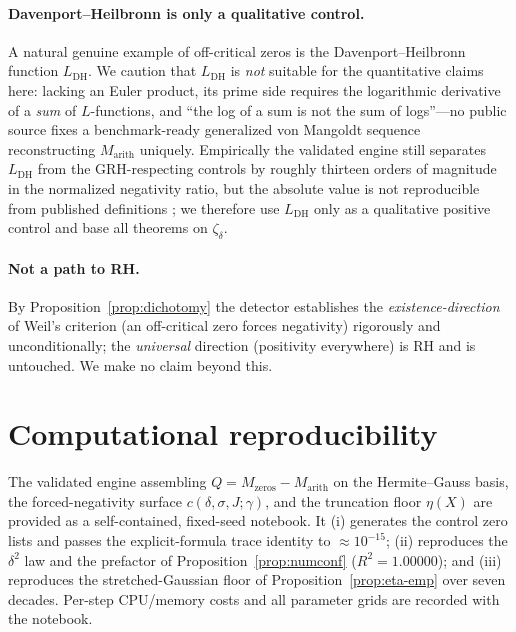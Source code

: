 \documentclass[11pt]{amsart}
\theoremstyle{definition}
\theoremstyle{remark}
\newcommand{\LDH}{L_{\mathrm{DH}}}
\begin{document}
\paragraph{Davenport--Heilbronn is only a qualitative control.}
A natural genuine example of off-critical zeros is the Davenport--Heilbronn
function $\LDH$. We caution that $\LDH$ is \emph{not} suitable for the
quantitative claims here: lacking an Euler product, its prime side requires
the logarithmic derivative of a \emph{sum} of $L$-functions, and ``the log of
a sum is not the sum of logs''---no public source fixes a benchmark-ready
generalized von Mangoldt sequence reconstructing $M_{\mathrm{arith}}$
uniquely. Empirically the validated engine still separates $\LDH$ from the
GRH-respecting controls by roughly thirteen orders of magnitude in the
normalized negativity ratio, but the absolute value is not reproducible from
published definitions \cite{TrejoV8}; we therefore use $\LDH$ only as a
qualitative positive control and base all theorems on $\zeta_\delta$.

\paragraph{Not a path to RH.}
By Proposition~\ref{prop:dichotomy} the detector establishes the
\emph{existence-direction} of Weil's criterion (an off-critical zero forces
negativity) rigorously and unconditionally; the \emph{universal} direction
(positivity everywhere) is RH and is untouched. We make no claim beyond this.

\section{Computational reproducibility}\label{sec:repro}

The validated engine \cite{TrejoV8} assembling $Q=M_{\mathrm{zeros}}-
M_{\mathrm{arith}}$ on the Hermite--Gauss basis, the forced-negativity
surface $c(\delta,\sigma,J;\gamma)$, and the truncation floor $\eta(X)$ are
provided as a self-contained, fixed-seed notebook. It (i) generates the
control zero lists and passes the explicit-formula trace identity to
$\approx10^{-15}$; (ii) reproduces the $\delta^2$ law and the prefactor of
Proposition~\ref{prop:numconf} ($R^2=1.00000$); and (iii) reproduces the
stretched-Gaussian floor of Proposition~\ref{prop:eta-emp} over seven
decades. Per-step CPU/memory costs and all parameter grids are recorded with
the notebook.
\end{document}
